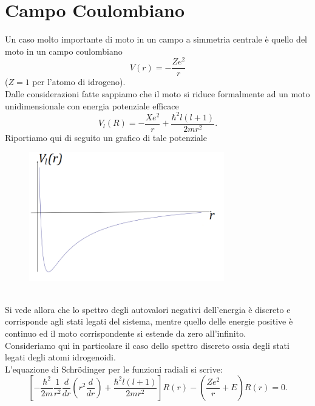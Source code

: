 \documentclass[a4paper,12pt,oneside]{book}
\begin{document}
\section{Campo Coulombiano}
Un caso molto importante di  moto in un campo a simmetria centrale è quello del moto in un campo coulombiano
\begin{equation}
V\left(r\right)=-\frac{Ze^2}{r} 
\end{equation}
($Z=1$ per l'atomo di idrogeno).\\
Dalle considerazioni fatte sappiamo che il moto si riduce formalmente ad un moto unidimensionale con energia potenziale efficace
\begin{equation}
V_l\left(R\right)=-\frac{Xe^2}{r}+\frac{\hbar^2l\left(l+1\right)}{2mr^2} .
\end{equation}
Riportiamo qui di seguito un grafico di tale potenziale\\
\begin{figure}[!htbp]
\begin{center}
\includegraphics[width=8.5cm]{immagini/cap_21/fig_21_1.png}
\end{center}
\end{figure}\\
Si vede allora che lo spettro degli autovalori negativi dell'energia è discreto e corrisponde agli stati legati del sistema, mentre quello delle energie positive è continuo ed il moto corrispondente si estende da zero all'infinito.\\
Consideriamo qui in particolare il caso dello spettro discreto ossia degli stati legati degli atomi idrogenoidi.\\
L'equazione di Schr\"{o}dinger per le funzioni radiali si scrive:
\begin{equation}
\left[-\frac{\hbar^2}{2m}\frac{1}{r^2}\frac{d}{d r}\left(r^2\frac{d}{d r}\right)+\frac{\hbar^2l\left(l+1\right)}{2mr^2}\right]R\left(r\right)-\left(\frac{Ze^2}{r}+E\right)R\left(r\right)=0 .
\label{21.4}
\end{equation}
\end{document}
